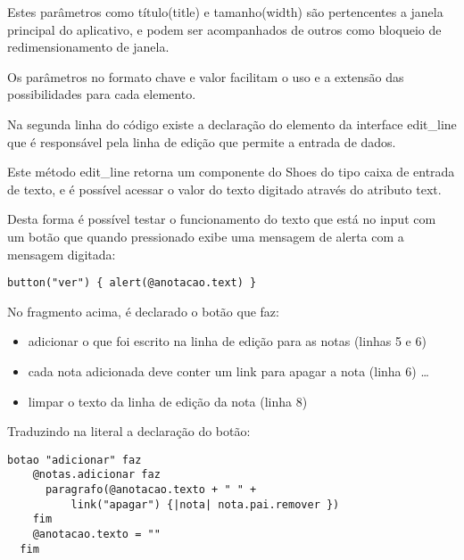 \documentclass[espaco=simples,appendix=Name]{abnt}
\begin{document}
 

Estes parâmetros como título(title) e tamanho(width) são pertencentes a janela principal do aplicativo, e podem ser acompanhados de outros como bloqueio de redimensionamento de janela.

Os parâmetros no formato chave e valor facilitam o uso e a extensão das possibilidades para cada elemento.

Na segunda linha do código existe a declaração do elemento da interface edit\_line que é responsável pela linha de edição que permite a entrada de dados. 
 

Este método edit\_line retorna um componente do Shoes do tipo caixa de entrada de texto, e é possível acessar o valor do texto digitado através do atributo text. 

Desta forma é possível testar o funcionamento do texto que está no input com um botão que quando pressionado exibe uma mensagem de alerta com a mensagem digitada:

\begin{lstlisting}[caption=Entendendo a linha de edição]
button("ver") { alert(@anotacao.text) } 
\end{lstlisting}


 

No fragmento acima, é declarado o botão que faz: 

\begin{itemize} 
  \item adicionar o que foi escrito na linha de edição para as notas (linhas 5 e 6)
  \item cada nota adicionada deve conter um link para apagar a nota (linha 6) \ldots
  \item limpar o texto da linha de edição da nota (linha 8)
\end{itemize} 

Traduzindo na literal a declaração do botão:

\begin{lstlisting}[caption=Botão adicionar - código traduzido]
  botao "adicionar" faz
    @notas.adicionar faz 
      paragrafo(@anotacao.texto + " " + 
          link("apagar") {|nota| nota.pai.remover })
    fim  
    @anotacao.texto = ""
  fim
\end{lstlisting}
\end{document}
